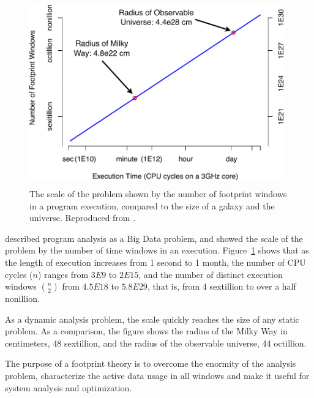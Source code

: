 \begin{figure}[]
  \centering
  \includegraphics[width=11cm,height=8cm]{figures/intro/WindowSizes2}
  \caption{The scale of the problem shown by the number of footprint
    windows in a program execution, compared to the size of a galaxy and the universe.  Reproduced from \cite{Brock+:BDAW13}.}
  \label{fig:bigdata}
\end{figure}

\cite{Brock+:BDAW13} described program analysis as a Big Data problem, 
and showed the scale of the problem by the number of time
windows in an execution.
Figure~\ref{fig:bigdata} shows that as the length of execution increases from 1
second to 1 month, the number of CPU cycles ($n$) ranges from $3E9$ to
$2E15$, and the number of distinct execution windows $n \choose 2$
from $4.5E18$ to $5.8E29$, that is, from 4 sextillion to over a half
nonillion.  

As a dynamic analysis problem, the scale 
quickly reaches the size of any static problem.  As a comparison, 
the figure shows the radius of the Milky Way in centimeters, 48 sextillion,
and the radius of the observable universe, 44 octillion.

The purpose of a footprint theory is to overcome the enormity of the
analysis problem, characterize the active data usage in all windows
and make it useful for system analysis and optimization.

